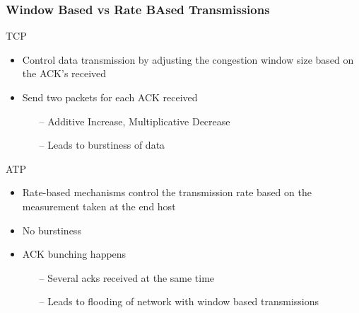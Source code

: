 \begin{frame}[t]
  \frametitle{Window Based vs Rate BAsed Transmissions}

  TCP
  \begin{itemize}
  \item Control data transmission by adjusting the congestion window size based on the ACK's received
  \item Send two packets for each ACK received
    \begin{itemize}
      \item[--] Additive Increase, Multiplicative Decrease
      \item[--] Leads to burstiness of data
    \end{itemize}
  \end{itemize}

  \vfill

  ATP
  \begin{itemize}
  \item Rate-based mechanisms control the transmission rate based on the measurement taken at the end host
  \item No burstiness
  \item ACK bunching happens
    \begin{itemize}
      \item[--] Several acks received at the same time
      \item[--] Leads to flooding of network with window based transmissions
    \end{itemize}
  \end{itemize}

    \vfill

  \begin{flushleft}
    \begin{tiny}
      \begin{minipage}{1.0\linewidth}
      \end{minipage}
    \end{tiny}
  \end{flushleft}

\end{frame}    

